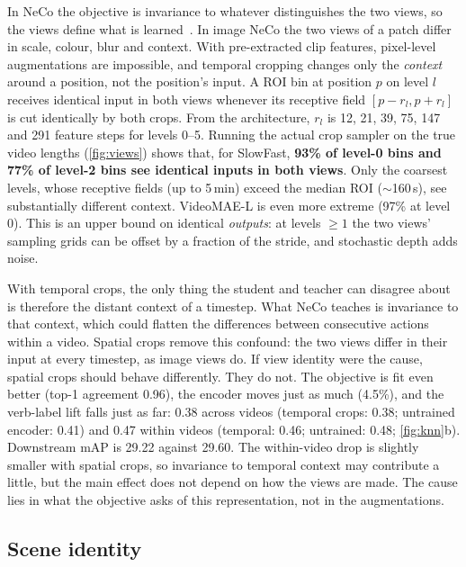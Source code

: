\documentclass[10pt,a4paper]{article}
\begin{document}
In NeCo the objective is invariance to whatever distinguishes the two views, so the
views define what is learned~\cite{chen2020simclr,tian2020goodviews}. In image NeCo the
two views of a patch differ in scale, colour, blur and context. With pre-extracted clip
features, pixel-level augmentations are impossible, and temporal cropping changes only the
\emph{context} around a position, not the position's input. A ROI bin at position $p$ on
level $l$ receives identical input in both views whenever its receptive field
$[p-r_l,p+r_l]$ is cut identically by both crops. From the architecture, $r_l$ is 12, 21,
39, 75, 147 and 291 feature steps for levels 0--5. Running the actual crop sampler on the
true video lengths (\cref{fig:views}) shows that, for SlowFast, \textbf{93\% of level-0
bins and 77\% of level-2 bins see identical inputs in both views}. Only the coarsest
levels, whose receptive fields (up to 5\,min) exceed the median ROI ($\sim$160\,s), see
substantially different context. VideoMAE-L is even more extreme (97\% at level 0). This
is an upper bound on identical \emph{outputs}: at levels $\ge 1$ the two views' sampling
grids can be offset by a fraction of the stride, and stochastic depth adds noise.

With temporal crops, the only thing the student and teacher can disagree about is
therefore the distant context of a timestep. What NeCo teaches is invariance to that
context, which could flatten the differences between consecutive actions within a
video. Spatial crops remove this confound: the two views differ in their input at every
timestep, as image views do. If view identity were the cause, spatial crops should behave
differently. They do not. The objective is fit even better (top-1 agreement 0.96), the
encoder moves just as much (4.5\%), and the verb-label lift falls just as far: 0.38 across
videos (temporal crops: 0.38; untrained encoder: 0.41) and 0.47 within videos (temporal:
0.46; untrained: 0.48; \cref{fig:knn}b). Downstream mAP is 29.22 against 29.60. The
within-video drop is slightly smaller with spatial crops, so invariance to temporal context
may contribute a little, but the main effect does not depend on how the views are made.
The cause lies in what the objective asks of this representation, not in the
augmentations.

\subsection{Scene identity}\label{sec:why-scene}
\end{document}

